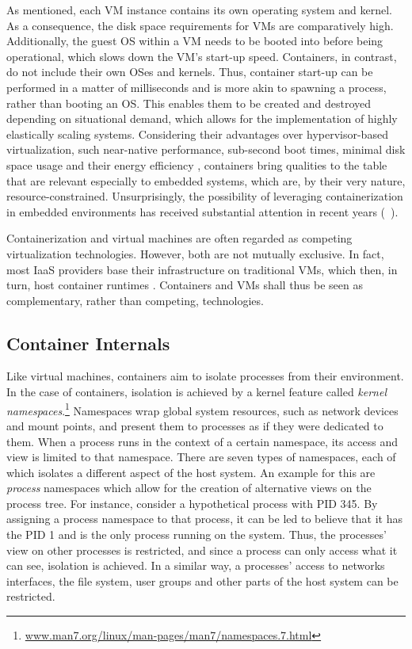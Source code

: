 As mentioned, each VM instance contains its own operating system and kernel. As a consequence, the disk space requirements for VMs are comparatively high. Additionally, the guest OS within a VM needs to be booted into before being operational, which slows down the VM's start-up speed. Containers, in contrast, do not include their own OSes and kernels. Thus, container start-up can be performed in a matter of milliseconds and is more akin to spawning a process, rather than booting an OS. This enables them to be created and destroyed depending on situational demand, which allows for the implementation of highly elastically scaling systems. 
Considering their advantages over hypervisor-based virtualization, such near-native performance, sub-second boot times, minimal disk space usage and their energy efficiency \cite{morabito2015power}, containers bring qualities to the table that are relevant especially to embedded systems, which are, by their very nature, resource-constrained. Unsurprisingly, the possibility of leveraging containerization in embedded environments has received substantial attention in recent years (\eg\  \cite{bellavista2017feasibility, javed2016container, morabito2017virtualization}).

Containerization and virtual machines are often regarded as competing virtualization technologies. However, both are not mutually exclusive. In fact, most IaaS providers base their infrastructure on traditional VMs, which then, in turn, host container runtimes \cite{dua2014virtualization}. Containers and VMs shall thus be seen as complementary, rather than competing, technologies.

\subsection{Container Internals}
Like virtual machines, containers aim to isolate processes from their environment. In the case of containers, isolation is achieved by a kernel feature called \emph{kernel namespaces}.\footnote{\url{www.man7.org/linux/man-pages/man7/namespaces.7.html}} Namespaces wrap global system resources, such as network devices and mount points, and present them to processes as if they were dedicated to them.
When a process runs in the context of a certain namespace, its access and view is limited to that namespace.
There are seven types of namespaces, each of which isolates a different aspect of the host system.
An example for this are \emph{process} namespaces which allow for the creation of alternative views on the process tree. For instance, consider a hypothetical process with PID 345. By assigning a process namespace to that process, it can be led to believe that it has the PID 1 and is the only process running on the system. Thus, the processes' view on other processes is restricted, and since a process can only access what it can see, isolation is achieved.
In a similar way, a processes' access to networks interfaces, the file system, user groups and other parts of the host system can be restricted.

